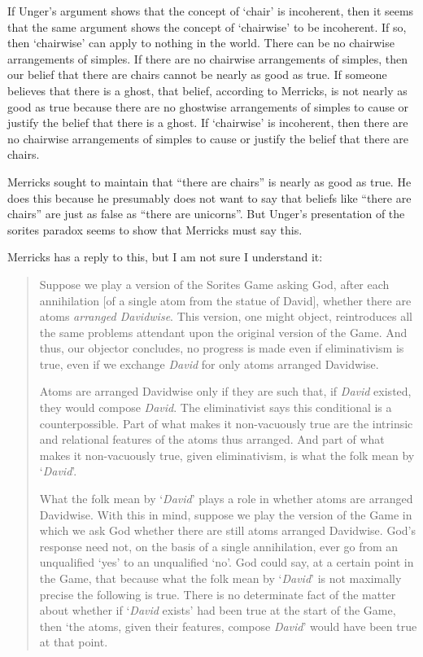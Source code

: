 \documentclass[11pt]{standalone} \newif\ifstandlone \standalonetrue
\newenvironment{squote}{%
	\begin{quote}\begin{singlespace}%
	}{%
	\end{singlespace}\end{quote}}
\begin{document}
\begin{spacing}{1.5}
If Unger's argument shows that the concept of `chair' is incoherent,
then it seems that the same argument shows the concept of `chairwise'
to be incoherent.  If so, then `chairwise' can apply to nothing in the
world.  There can be no chairwise arrangements of simples.  If there
are no chairwise arrangements of simples, then our belief that there
are chairs cannot be nearly as good as true.  If someone believes that
there is a ghost, that belief, according to Merricks, is not nearly as
good as true because there are no ghostwise arrangements of simples to
cause or justify the belief that there is a ghost.  If `chairwise' is
incoherent, then there are no chairwise arrangements of simples to
cause or justify the belief that there are chairs.

Merricks sought to maintain that ``there are chairs'' is nearly as
good as true.  He does this because he presumably does not want to say
that beliefs like ``there are chairs'' are just as false as ``there
are unicorns''.  But Unger's presentation of the sorites paradox seems
to show that Merricks must say this.

Merricks has a reply to this, but I am not sure I understand it:

\begin{squote}
Suppose we play a version of the Sorites Game asking God, after each
annihilation [of a single atom from the statue of David], whether
there are atoms {\em arranged Davidwise}.  This version, one might
object, reintroduces all the same problems attendant upon the original
version of the Game.  And thus, our objector concludes, no progress is
made even if eliminativism is true, even if we exchange {\em David}
for only atoms arranged Davidwise.  

Atoms are arranged Davidwise only if they are such that, if {\em
  David} existed, they would compose {\em David}.  The eliminativist
says this conditional is a counterpossible. Part of what makes it
non-vacuously true are the intrinsic and relational features of the
atoms thus arranged.  And part of what makes it non-vacuously true,
given eliminativism, is what the folk mean by `{\em David}'.

What the folk mean by `{\em David}' plays a role in whether atoms are
arranged Davidwise.  With this in mind, suppose we play the version of
the Game in which we ask God whether there are still atoms arranged
Davidwise.  God's response need not, on the basis of a single
annihilation, ever go from an unqualified `yes' to an unqualified
`no'. God could say, at a certain point in the Game, that because what
the folk mean by `{\em David}' is not maximally precise the following
is true.  There is no determinate fact of the matter about whether if
`{\em David} exists' had been true at the start of the Game, then `the
atoms, given their features, compose {\em David}' would have been true
at that point.


\end{squote}
\end{spacing}
\end{document}
